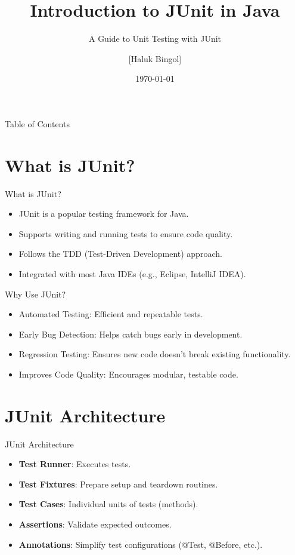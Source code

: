 \documentclass{beamer}
\title{Introduction to JUnit in Java}
\subtitle{A Guide to Unit Testing with JUnit}
\author{[Haluk Bingol]}
\date{\today}
\begin{document}
\frame{\titlepage}

\begin{frame}{Table of Contents}
    \tableofcontents
\end{frame}


\section{What is JUnit?}

\begin{frame}{What is JUnit?}
	\begin{itemize}
		\item JUnit is a popular testing framework for Java.
		\item Supports writing and running tests to ensure code quality.
		\item Follows the TDD (Test-Driven Development) approach.
		\item Integrated with most Java IDEs (e.g., Eclipse, IntelliJ IDEA).
	\end{itemize}
\end{frame}

\begin{frame}{Why Use JUnit?}
	\begin{itemize}
		\item Automated Testing: Efficient and repeatable tests.
		\item Early Bug Detection: Helps catch bugs early in development.
		\item Regression Testing: Ensures new code doesn’t break existing functionality.
		\item Improves Code Quality: Encourages modular, testable code.
	\end{itemize}
\end{frame}

\section{JUnit Architecture}

\begin{frame}{JUnit Architecture}
	\begin{itemize}
		\item \textbf{Test Runner}: Executes tests.
		\item \textbf{Test Fixtures}: Prepare setup and teardown routines.
		\item \textbf{Test Cases}: Individual units of tests (methods).
		\item \textbf{Assertions}: Validate expected outcomes.
		\item \textbf{Annotations}: Simplify test configurations (@Test, @Before, etc.).
	\end{itemize}
\end{frame}
\end{document}
